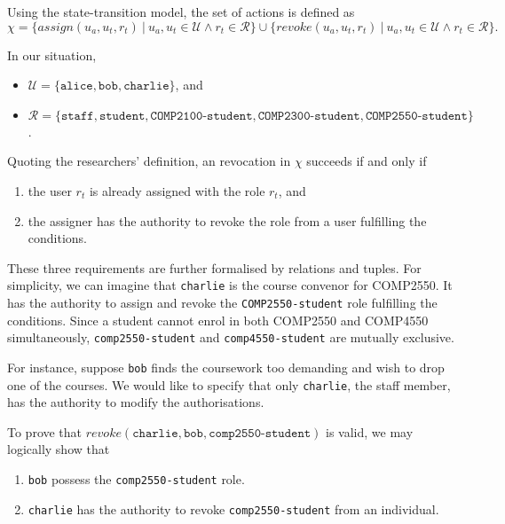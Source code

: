 \documentclass{article}
\begin{document}
Using the state-transition model, the set of actions\cite{formal-verification} is defined as $$\chi = \{ \textit{assign}(u_{a}, u_{t}, r_{t})\ |\ u_{a}, u_{t} \in \mathcal{U} \land r_{t} \in \mathcal{R} \} \cup \{ \textit{revoke}(u_{a}, u_{t}, r_{t})\ |\ u_{a}, u_{t} \in \mathcal{U} \land r_{t} \in \mathcal{R} \}.$$

In our situation,
\begin{itemize}
    \item $\mathcal{U} = \{ \texttt{alice}, \texttt{bob}, \texttt{charlie} \}$, and
    \item $\mathcal{R} = \{ \texttt{staff}, \texttt{student}, \texttt{COMP2100-student}, \texttt{COMP2300-student}, \texttt{COMP2550-student} \}$.
\end{itemize}

Quoting the researchers' definition, an revocation in $\chi$ succeeds if and only if
\begin{enumerate}
    \item the user $r_{t}$ is already assigned with the role $r_{t}$, and
    \item the assigner has the authority to revoke the role from a user fulfilling the conditions.
\end{enumerate}
These three requirements are further formalised by relations and tuples. For simplicity, we can imagine that \texttt{charlie} is the course convenor for COMP2550. It has the authority to assign and revoke the \texttt{COMP2550-student} role fulfilling the conditions. Since a student cannot enrol in both COMP2550 and COMP4550 simultaneously, \texttt{comp2550-student} and \texttt{comp4550-student} are mutually exclusive.

For instance, suppose \texttt{bob} finds the coursework too demanding and wish to drop one of the courses. We would like to specify that only \texttt{charlie}, the staff member, has the authority to modify the authorisations.

To prove that $\textit{revoke}(\texttt{charlie}, \texttt{bob}, \texttt{comp2550-student})$ is valid, we may logically show that
\begin{enumerate}
    \item \texttt{bob} possess the \texttt{comp2550-student} role.
    \item \texttt{charlie} has the authority to revoke \texttt{comp2550-student} from an individual.
\end{enumerate}
\end{document}
